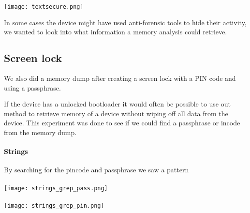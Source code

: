   \texttt{[image: textsecure.png]}
  
  In some cases the device might have used anti-forensic tools to hide their 
  activity, we wanted to look into what information a memory analysis could 
  retrieve.
  \subsection{Screen lock}
  We also did a memory dump after creating a screen lock with a PIN code and using a passphrase.
  
  If the device has a unlocked bootloader it would often be possible to use out 
  method to retrieve memory of a device without wiping off all data from the 
  device. This experiment was done to see if we could find a passphrase or 
  incode from the memory dump.

  \paragraph{Strings}
  By searching for the pincode and passphrase we saw a pattern 
  \\
  \\
  \texttt{[image: strings\_grep\_pass.png]}\\
  \\
  \texttt{[image: strings\_grep\_pin.png]}

